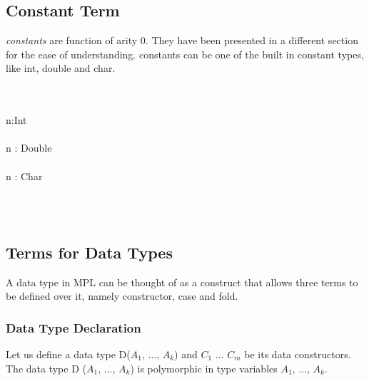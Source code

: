 \documentclass[11pt]{article}
\begin{document}
\subsection {Constant Term}
\emph {constants} are function of arity 0. They have been presented in a different section for the ease of understanding. constants can be one of the built in constant types, like int, double and char.
~~\\~~\\
\begin{mdframed} [style=MyFrame,userdefinedwidth=10cm,align=center,
                  frametitle=Typing rule for constants,frametitlerule=true,
                  frametitlerulewidth = 1pt
                 ]
~~\\
  { 
    \Gamma \vdash n:Int
  }~~\\~~\\

  { 
    \Gamma \vdash n : Double
  }~~\\~~\\

  { 
    \Gamma \vdash n : Char
  }

\end{mdframed}
~~\\~~\\
\subsection {Terms for Data Types}
A data type in MPL can be thought of as a construct that allows three terms to be defined over it, namely constructor, case and fold. 
\subsubsection {Data Type Declaration}\label{dataDef}
Let us define a data type D($A_1$, $\ldots$, $A_k$) and $C_1$ $\ldots$ $C_m$ be its data constructors. The data type D ($A_1$, $\ldots$, $A_k$)  is polymorphic in type variables $A_1$, $\ldots$, $A_k$.
\end{document}
